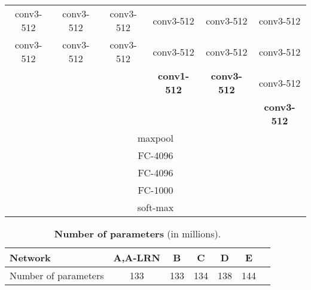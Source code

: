 \documentclass{article} %
\begin{document}
\begin{table}[htb]
\begin{tabular}{|c|c|c|c|c|c|}
conv3-512 & conv3-512 & conv3-512 & conv3-512 & conv3-512 & conv3-512 \\ 
conv3-512 & conv3-512 & conv3-512 & conv3-512 & conv3-512 & conv3-512 \\ 
& & & \textbf{conv1-512} & \textbf{conv3-512} & conv3-512 \\ 
& & & & & \textbf{conv3-512} \\ \hline
\multicolumn{6}{|c|}{maxpool} \\ \hline
\multicolumn{6}{|c|}{FC-4096} \\ \hline
\multicolumn{6}{|c|}{FC-4096} \\ \hline
\multicolumn{6}{|c|}{FC-1000} \\ \hline
\multicolumn{6}{|c|}{soft-max} \\ \hline
\end{tabular}
\label{tab:config}
\end{table}
\begin{table}[htb]
\small
\centering
\caption{\textbf{Number of parameters} (in millions).}
\begin{tabular}{|l|c|c|c|c|c|c|} \hline
Network & A,A-LRN & B & C & D & E \\ \hline
Number of parameters & 133 & 133 & 134 & 138 & 144 \\ \hline
\end{tabular}
\label{tab:num_params}
\end{table}
\end{document}
